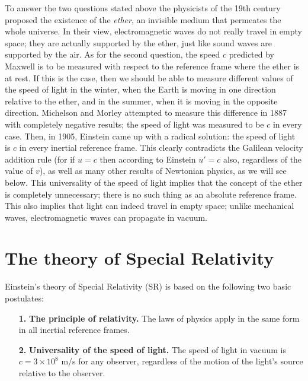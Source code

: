 \documentclass[11pt, a4paper,oneside,openright]{book}
\numberwithin{equation}{section}
\begin{document}
To answer the two questions stated above the physicists of the 19th century proposed the existence of the {\it ether}, an invisible medium that permeates the whole universe. In their view, electromagnetic waves do not really travel in empty space; they are actually supported by the ether, just like sound waves are supported by the air. As for the second question, the speed $c$ predicted by Maxwell is to be measured with respect to the reference frame where the ether is at rest. If this is the case, then we should be able to measure different values of the speed of light in the winter, when the Earth is moving in one direction relative to the ether, and in the summer, when it is moving in the opposite direction. Michelson and Morley attempted to measure this difference in 1887 with completely negative results; the speed of light was measured to be $c$ in every case. Then, in 1905, Einstein came up with a radical solution: the speed of light is $c$ in every inertial reference frame. This clearly contradicts 
the Galilean velocity addition rule (for if $u=c$ then according to Einstein $u'=c$ also, regardless of the value of $v$), as well as many other results of Newtonian physics, as we will see below. This universality of the speed of light implies that the concept of the ether is completely unnecessary; there is no such thing as an absolute reference frame. This also implies that light can indeed travel in empty space; unlike mechanical waves, electromagnetic waves can propagate in vacuum.


\section{The theory of Special Relativity}

Einstein's theory of Special Relativity (SR) is based on the following two basic postulates:
\begin{itemize}
\item [\bf 1.] {\bf The principle of relativity.} The laws of physics apply in the same form in all inertial reference frames.
\item [\bf 2.] {\bf Universality of the speed of light.} The speed of light in vacuum is $c=3\times10^8$ m/s for any observer, regardless of the motion of the light's source relative to the observer.
\end{itemize}
\end{document}
